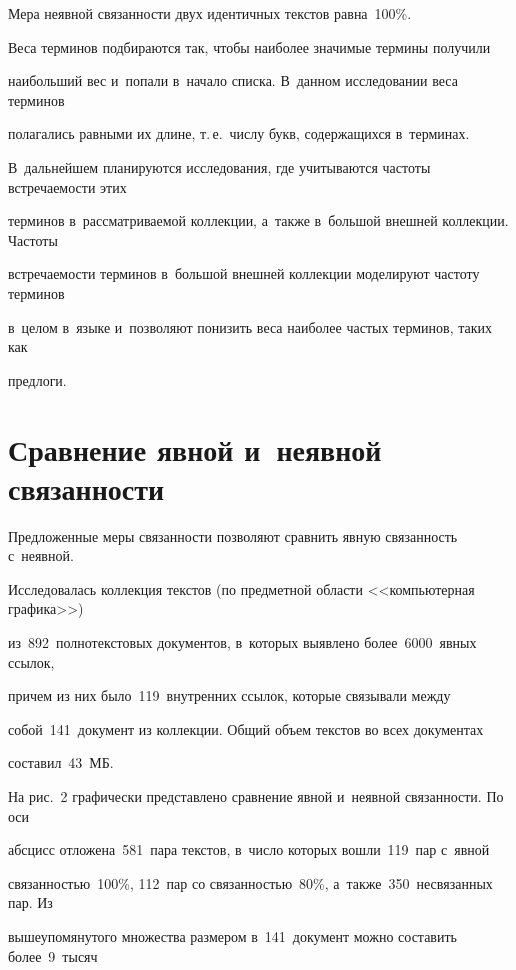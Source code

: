      

     Мера неявной связанности двух идентичных текстов равна~100\%.

     

     Веса терминов подбираются так, чтобы наиболее значимые термины получили 

наибольший вес и~попали в~начало списка. В~данном исследовании веса терминов 

полагались равными их длине, т.\,е.\ числу букв, содержащихся в~терминах. 

В~дальнейшем планируются исследования, где учитываются частоты встречаемости этих 

терминов в~рассматриваемой коллекции, а~также в~большой внешней коллекции. Частоты 

встречаемости терминов в~большой внешней коллекции моделируют частоту терминов 

в~целом в~языке и~позволяют понизить веса наиболее частых терминов, таких как 

предлоги.

     

\section{Сравнение явной и~неявной связанности}

     

     Предложенные меры связанности позволяют сравнить явную связанность с~неявной. 

Исследовалась коллекция текстов (по предметной области <<компьютерная графика>>) 

из~892~полнотекстовых документов, в~которых выявлено более~6000~явных ссылок, 

причем из них было~119~внутренних ссылок, которые связывали между 

собой~141~документ из коллекции. Общий объем текстов во всех документах 

составил~43~МБ. 

     

     На рис.~2 графически представлено сравнение явной и~неявной связанности. По оси 

абсцисс отложена~581~пара текстов, в~число которых вошли~119~пар с~явной 

связанностью~100\%, 112~пар со связанностью~80\%, а~также~350~несвязанных пар. Из 

вышеупомянутого множества размером в~141~документ можно составить более~9~тысяч 

